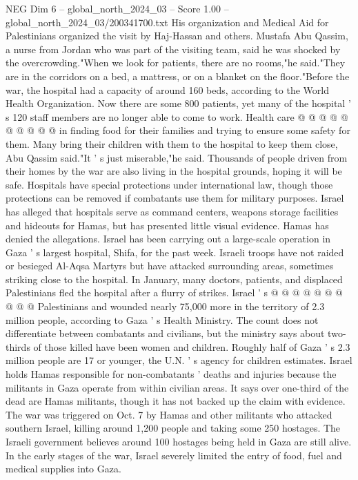 \begin{textsample}{NEG Dim 6 – global\_north\_2024\_03 – Score 1.00 – global\_north\_2024\_03/200341700.txt}
His organization and Medical Aid for Palestinians organized the visit by Haj-Hassan and others.
Mustafa Abu Qassim, a nurse from Jordan who was part of the visiting team, said he was shocked by the overcrowding."When we look for patients, there are no rooms,"he said."They are in the corridors on a bed, a mattress, or on a blanket on the floor."Before the war, the hospital had a capacity of around 160 beds, according to the World Health Organization.
Now there are some 800 patients, yet many of the hospital ' s 120 staff members are no longer able to come to work.
Health care @ @ @ @ @ @ @ @ @ @ in finding food for their families and trying to ensure some safety for them.
Many bring their children with them to the hospital to keep them close, Abu Qassim said."It ' s just miserable,"he said.
Thousands of people driven from their homes by the war are also living in the hospital grounds, hoping it will be safe.
Hospitals have special protections under international law, though those protections can be removed if combatants use them for military purposes.
Israel has alleged that hospitals serve as command centers, weapons storage facilities and hideouts for Hamas, but has presented little visual evidence.
Hamas has denied the allegations.
Israel has been carrying out a large-scale operation in Gaza ' s largest hospital, Shifa, for the past week.
Israeli troops have not raided or besieged Al-Aqsa Martyrs but have attacked surrounding areas, sometimes striking close to the hospital.
In January, many doctors, patients, and displaced Palestinians fled the hospital after a flurry of strikes.
Israel ' s @ @ @ @ @ @ @ @ @ @ Palestinians and wounded nearly 75,000 more in the territory of 2.3 million people, according to Gaza ' s Health Ministry.
The count does not differentiate between combatants and civilians, but the ministry says about two-thirds of those killed have been women and children.
Roughly half of Gaza ' s 2.3 million people are 17 or younger, the U.N. ' s agency for children estimates.
Israel holds Hamas responsible for non-combatants ' deaths and injuries because the militants in Gaza operate from within civilian areas.
It says over one-third of the dead are Hamas militants, though it has not backed up the claim with evidence.
The war was triggered on Oct. 7 by Hamas and other militants who attacked southern Israel, killing around 1,200 people and taking some 250 hostages.
The Israeli government believes around 100 hostages being held in Gaza are still alive.
In the early stages of the war, Israel severely limited the entry of food, fuel and medical supplies into Gaza.

\end{textsample}
